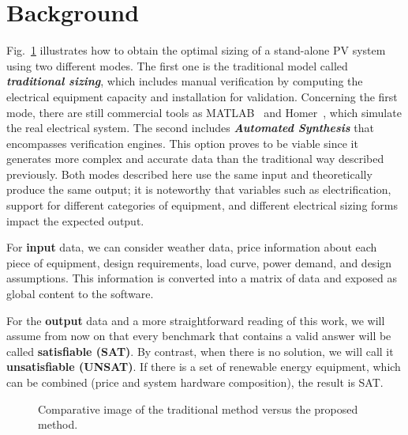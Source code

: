 \documentclass[10pt,journal,compsoc]{IEEEtran}
\begin{document}
\section{Background}
\label{sec:AutomatedVerification}
 
Fig.~\ref{fig:optimization} illustrates how to obtain the optimal sizing of a stand-alone PV system using two different modes. The first one is the traditional model called \textit{\textbf{traditional sizing}}, which includes manual verification by computing the electrical equipment capacity and installation for validation. Concerning the first mode, there are still commercial tools as MATLAB~\cite{Benatiallah2017} and Homer~\cite{Pradhan,Swarnkar}, which simulate the real electrical system. The second includes \textbf{\textit{Automated Synthesis}} that encompasses verification engines. This option proves to be viable since it generates more complex and accurate data than the traditional way described previously. Both modes described here use the same input and theoretically produce the same output; it is noteworthy that variables such as electrification, support for different categories of equipment, and different electrical sizing forms impact the expected output.

For \textbf{input} data, we can consider weather data, price information about each piece of equipment, design requirements, load curve, power demand, and design assumptions. This information is converted into a matrix of data and exposed as global content to the software.

For the \textbf{output} data and a more straightforward reading of this work, we will assume from now on that every benchmark that contains a valid answer will be called \textbf{satisfiable (SAT)}. By contrast, when there is no solution, we will call it \textbf{unsatisfiable (UNSAT)}. If there is a set of renewable energy equipment, which can be combined (price and system hardware composition), the result is SAT.
%
\begin{figure}[h]
\centering
\caption{Comparative image of the traditional method versus the proposed method.}
\label{fig:optimization}
\end{figure}
  
\end{document}
